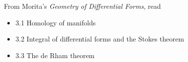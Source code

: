 \documentclass{homework}
\author{Jim Fowler}
\date{Week 7: Homology and cohomology}
\begin{document}
\maketitle

From Morita's \textit{Geometry of Differential Forms}, read
\begin{itemize}
\item 3.1 Homology of manifolds
\item 3.2 Integral of differential forms and the Stokes theorem
\item 3.3 The de Rham theorem
\end{itemize}
\end{document}
